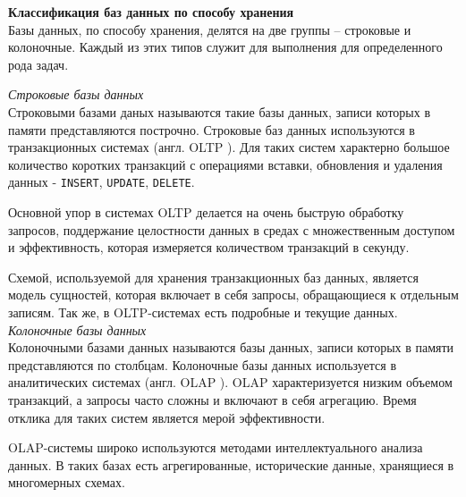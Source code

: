 %
%

\noindent\textbf{Классификация баз данных по способу хранения}\\
Базы данных, по способу хранения, делятся на две группы -- строковые и колоночные. Каждый из этих типов служит для выполнения для определенного рода задач.


\textit{Строковые базы данных}\\

Строковыми базами даных называются такие базы данных, записи которых в памяти представляются построчно.
Строковые баз данных используются в транзакционных системах (англ. OLTP \cite{OLTP}). Для таких систем характерно большое количество коротких транзакций с операциями вставки, обновления и удаления данных - \texttt{INSERT}, \texttt{UPDATE}, \texttt{DELETE}.

Основной упор в системах OLTP делается на очень быструю обработку запросов, поддержание целостности данных в средах с множественным доступом и эффективность, которая измеряется количеством транзакций в секунду.

Схемой, используемой для хранения транзакционных баз данных, является модель сущностей, которая включает в себя запросы, обращающиеся к отдельным записям. Так же, в OLTP-системах есть подробные и текущие данных.\\

\textit{Колоночные базы данных}\\

Колоночными базами данных называются базы данных, записи которых в памяти представляются по столбцам. Колоночные базы данных используется в аналитических системах (англ. OLAP \cite{OLAP}). OLAP характеризуется низким объемом транзакций, а запросы часто сложны и включают в себя агрегацию. Время отклика для таких систем является мерой эффективности.

OLAP-системы широко используются методами интеллектуального анализа данных. В таких базах есть агрегированные, исторические данные, хранящиеся в многомерных схемах.

